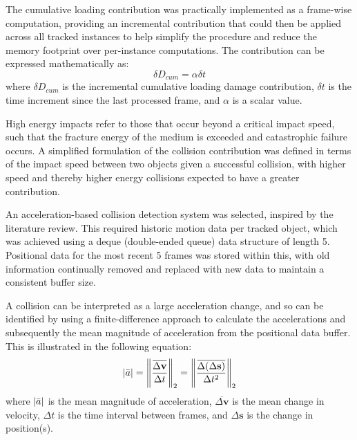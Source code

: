 \documentclass[10pt]{article}
\newcommand{\norm}[1]{\left\lVert #1 \right\rVert}
\renewcommand{\vec}[1]{\mathbf{#1}}
\newcommand*\mean[1]{\overline{#1}}
\begin{document}
The cumulative loading contribution was practically implemented as a frame-wise computation, providing an incremental contribution that could then be applied across all tracked instances to help simplify the procedure and reduce the memory footprint over per-instance computations. The contribution can be expressed mathematically as:
\begin{equation}
    \delta D_{cum} = \alpha \delta t
    \label{eqn:incremental_cumulative_load}
\end{equation}
where $\delta D_{cum}$ is the incremental cumulative loading damage contribution, $\delta t$ is the time increment since the last processed frame, and $\alpha$ is a scalar value.

High energy impacts refer to those that occur beyond a critical impact speed, such that the fracture energy of the medium is exceeded and catastrophic failure occurs. A simplified formulation of the collision contribution was defined in terms of the impact speed between two objects given a successful collision, with higher speed and thereby higher energy collisions expected to have a greater contribution. 

An acceleration-based collision detection system was selected, inspired by the literature review. This required historic motion data per tracked object, which was achieved using a deque (double-ended queue) data structure of length 5. Positional data for the most recent 5 frames was stored within this, with old information continually removed and replaced with new data to maintain a consistent buffer size.

A collision can be interpreted as a large acceleration change, and so can be identified by using a finite-difference approach to calculate the accelerations and subsequently the mean magnitude of acceleration from the positional data buffer. This is illustrated in the following equation: 
\begin{equation}
    |\Bar{a}| = \norm{\frac{ \mean{\Delta \vec{v}} }{ \Delta t }}_2 = \norm{ \frac{ \mean{\Delta (\Delta \vec{s})} }{ \Delta t^2 } }_2
    \label{eqn:finite_difference_acc}
\end{equation}
where $|\Bar{a}|$ is the mean magnitude of acceleration, $\overline{\Delta \vec{v}}$ is the mean change in velocity, $\Delta t$ is the time interval between frames, and $\Delta \vec{s}$ is the change in position(s).
\end{document}
